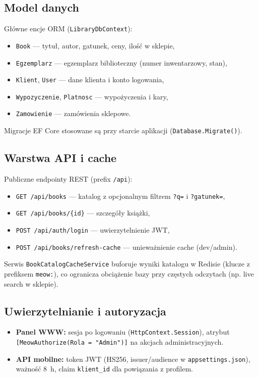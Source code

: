 \documentclass[12pt,a4paper]{article}
\begin{document}
\subsection{Model danych}

Główne encje ORM (\texttt{LibraryDbContext}):
\begin{itemize}
    \item \texttt{Book} --- tytuł, autor, gatunek, ceny, ilość w sklepie,
    \item \texttt{Egzemplarz} --- egzemplarz biblioteczny (numer inwentarzowy, stan),
    \item \texttt{Klient}, \texttt{User} --- dane klienta i konto logowania,
    \item \texttt{Wypozyczenie}, \texttt{Platnosc} --- wypożyczenia i kary,
    \item \texttt{Zamowienie} --- zamówienia sklepowe.
\end{itemize}

Migracje EF Core stosowane są przy starcie aplikacji (\texttt{Database.Migrate()}).

\subsection{Warstwa API i cache}

Publiczne endpointy REST (prefix \texttt{/api}):
\begin{itemize}
    \item \texttt{GET /api/books} --- katalog z opcjonalnym filtrem \texttt{?q=} i \texttt{?gatunek=},
    \item \texttt{GET /api/books/\{id\}} --- szczegóły książki,
    \item \texttt{POST /api/auth/login} --- uwierzytelnienie JWT,
    \item \texttt{POST /api/books/refresh-cache} --- unieważnienie cache (dev/admin).
\end{itemize}

Serwis \texttt{BookCatalogCacheService} buforuje wyniki katalogu w Redisie
(klucze z prefiksem \texttt{meow:}), co ogranicza obciążenie bazy przy częstych
odczytach (np. live search w sklepie).

\subsection{Uwierzytelnianie i autoryzacja}

\begin{itemize}
    \item \textbf{Panel WWW:} sesja po logowaniu (\texttt{HttpContext.Session}),
          atrybut \texttt{[MeowAuthorize(Rola = "Admin")]} na akcjach administracyjnych.
    \item \textbf{API mobilne:} token JWT (HS256, issuer/audience w \texttt{appsettings.json}),
          ważność 8~h, claim \texttt{klient\_id} dla powiązania z profilem.
\end{itemize}
\end{document}
